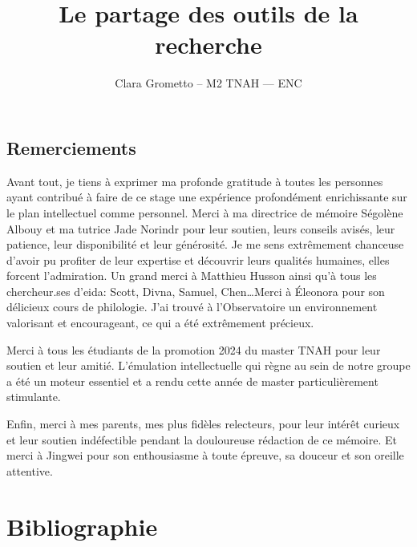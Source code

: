 \documentclass[a4paper,12pt,twoside]{book}
\author{Clara Grometto – M2 TNAH — ENC}
\title{Le partage des outils de la recherche}
\newcommand{\eida}{\gls{eida}\xspace}
\newcommand{\clearemptydoublepage}{\newpage{\pagestyle{empty}\cleardoublepage}}
\newcommand\chapterNo[1]{%
 \chapter*{#1}
  \markboth{}{} %
  \markright{\MakeUppercase{#1}}
}
\begin{document}
\onehalfspacing 

\frontmatter

    

    \thispagestyle{empty}	
    \clearemptydoublepage
	
    
	
    \chapterNo{Remerciements}
 
 Avant tout, je tiens à exprimer ma profonde gratitude à toutes les personnes ayant contribué à faire de ce stage une expérience profondément enrichissante sur le plan intellectuel comme personnel. Merci à ma directrice de mémoire Ségolène Albouy et ma tutrice Jade Norindr pour leur soutien, leurs conseils avisés, leur patience, leur disponibilité et leur générosité. Je me sens extrêmement chanceuse d'avoir pu profiter de leur expertise et découvrir leurs qualités humaines, elles forcent l'admiration. Un grand merci à Matthieu Husson ainsi qu'à tous les chercheur.ses d'\eida : Scott, Divna, Samuel, Chen\ldots Merci à Éleonora pour son délicieux cours de philologie. J'ai trouvé à l'Observatoire un environnement valorisant et encourageant, ce qui a été extrêmement précieux.
 
Merci à tous les étudiants de la promotion 2024 du master TNAH pour leur soutien et leur amitié. L'émulation intellectuelle qui règne au sein de notre groupe a été un moteur essentiel et a rendu cette année de master particulièrement stimulante. 
 
 Enfin, merci à mes parents, mes plus fidèles relecteurs, pour leur intérêt curieux et leur soutien indéfectible pendant la douloureuse rédaction de ce mémoire. Et merci à Jingwei pour son enthousiasme à toute épreuve, sa douceur et son oreille attentive. 
    
    \clearemptydoublepage
    
    \part*{Bibliographie}
    \clearemptydoublepage
    \printbibliography[keyword={hist astro},title={Histoire de l'astronomie}]
    \clearemptydoublepage
    \printbibliography[keyword={ia},title={IA~: généralités}]
    \clearemptydoublepage
    \printbibliography[keyword={eda},title={Documentation technique, méthodes, projets annexes}]
    \clearemptydoublepage
    \printbibliography[keyword={edit},title={Problématiques d'édition}]
    \clearemptydoublepage
    
\end{document}
